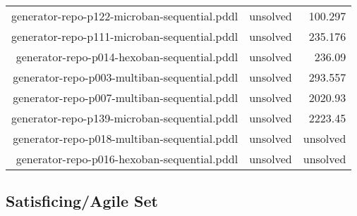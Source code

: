 \documentclass{article}
\begin{document}
\begin{center}
\begin{tabular}{r|r|r}
 generator-repo-p122-microban-sequential.pddl&unsolved&100.297\\
 generator-repo-p111-microban-sequential.pddl&unsolved&235.176\\
 generator-repo-p014-hexoban-sequential.pddl&unsolved&236.09\\
 generator-repo-p003-multiban-sequential.pddl&unsolved&293.557\\
 generator-repo-p007-multiban-sequential.pddl&unsolved&2020.93\\
 generator-repo-p139-microban-sequential.pddl&unsolved&2223.45\\
 generator-repo-p018-multiban-sequential.pddl&unsolved&unsolved\\
 generator-repo-p016-hexoban-sequential.pddl&unsolved&unsolved
                            \end{tabular}
                            \end{center}
                    
                    
                    \subsection*{Satisficing/Agile Set}
                    
\end{document}
